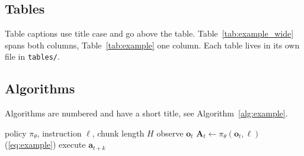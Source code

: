 

\subsection{Tables}
Table captions use title case and go above the table. Table~\ref{tab:example_wide} spans both columns, Table~\ref{tab:example} one column. Each table lives in its own file in \texttt{tables/}.



\subsection{Algorithms}
Algorithms are numbered and have a short title, see Algorithm~\ref{alg:example}.

\begin{algorithm}[t]
  \caption{Example of an Algorithm}
  \label{alg:example}
  \begin{algorithmic}[1]
    \REQUIRE policy $\pi_\theta$, instruction $\ell$, chunk length $H$
      \STATE observe $\mathbf{o}_t$
      \STATE $\mathbf{A}_t \gets \pi_\theta(\mathbf{o}_t, \ell)$ \hfill (\ref{eq:example})
        \STATE execute $\mathbf{a}_{t+k}$
      \ENDFOR
    \ENDWHILE
  \end{algorithmic}
\end{algorithm}
